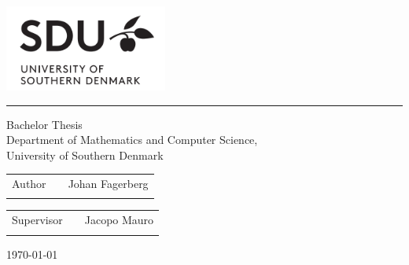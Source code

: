 \begin{titlepage}
\Large
\includegraphics[width=0.4\textwidth]{imgs/logo.png}
\renewcommand{\thepage}{Title}
\thispagestyle{empty}
   \begin{center}
       \vspace*{1cm}
\linespread{1.25}
       {\doublespacing \Huge\textbf{}}
\linespread{1}
       \rule{\linewidth}{1pt}
       {\huge Bachelor Thesis \\
       \Large Department of Mathematics and Computer Science, \\
       University of Southern Denmark}
\end{center}
\vspace{6cm}
\Large
\begin{tabularx}{\textwidth}{lXr}
Author & & Johan Fagerberg \\ \\
\end{tabularx}
\begin{tabularx}{\textwidth}{lXr}
Supervisor & & Jacopo Mauro\\ \\
\end{tabularx}

\vfill
\large \today
\end{titlepage}
